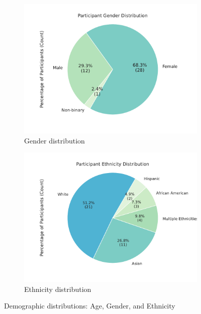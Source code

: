 \begin{figure}[h]
    \begin{subfigure}[b]{0.45\textwidth}
        \centering
        \includegraphics[width=\textwidth]{content/image/demo/demo_gender.pdf}
        \caption{Gender distribution}
        \label{fig:demoGender}
    \end{subfigure}
    \hfill
    \begin{subfigure}[b]{0.45\textwidth}
        \centering
        \includegraphics[width=\textwidth]{content/image/demo/demo_ethnicity.pdf}
        \caption{Ethnicity distribution}
        \label{fig:demoEthnicity}
    \end{subfigure}
    
    \caption{Demographic distributions: Age, Gender, and Ethnicity}
    \label{fig:Demographics}
\end{figure}

